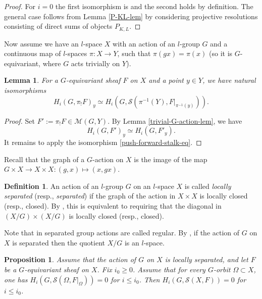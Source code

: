 \documentclass[12pt,reqno]{amsart}
\newtheorem{lemma}[theorem]{Lemma}
\newtheorem{prop}[theorem]{Proposition}
\theoremstyle{definition}
\newtheorem{definition}[theorem]{Definition}
\theoremstyle{remark}
\numberwithin{equation}{section}
\newcommand{\Om}{\Omega}
\renewcommand{\SS}{{\mathcal S}}
\newcommand{\MM}{{\mathcal M}}
\newcommand{\sub}{\subset}
\begin{document}
\begin{proof} For $i=0$ the first isomorphism is \cite[Prop.\ 2.36]{BZ} and the second holds by definition. 
The general case follows from Lemma \ref{P-KL-lem} by considering projective resolutions 
consisting of direct sums of objects $P_{K,L}$.
\end{proof}

Now assume we have an $l$-space $X$ with an action of an $l$-group $G$ and a continuous map of $l$-spaces
$\pi:X\to Y$, such that $\pi(gx)=\pi(x)$ (so it is $G$-equivariant, where $G$ acts trivially on $Y$).

\begin{lemma}\label{sh-G-hom-lem}
For a $G$-equivariant sheaf $F$ on $X$ and a point $y\in Y$, we have natural isomorphisms
$$H_i(G,\pi_!F)_y\simeq H_i(G,\SS(\pi^{-1}(Y),F|_{\pi^{-1}(y)})).$$
\end{lemma}

\begin{proof}
Set $F':=\pi_!F\in\MM(G,Y)$. By Lemma \ref{trivial-G-action-lem}, we have
$$H_i(G,F')_y\simeq H_i(G,F'_y).$$
It remains to apply the isomorphism \eqref{push-forward-stalk-eq}. 
\end{proof}

Recall that the graph of a $G$-action on $X$ is the image of the map $G\times X\to X\times X: (g,x)\mapsto (x,gx)$.

\begin{definition}\label{loc-sep-def}
An action of an $l$-group $G$ on an $l$-space $X$ is called {\it locally separated} (resp., {\it separated}) if the graph of the action in $X\times X$
is locally closed (resp., closed). By \cite[Lem.\ 6.2]{BZ}, this is equivalent to requiring that the diagonal in $(X/G)\times(X/G)$ is locally closed (resp., closed).
\end{definition}

Note that in \cite{BZ} separated group actions are called regular. By \cite[Lem.\ 6.4]{BZ}, if the action of $G$ on $X$ is separated then the quotient $X/G$ is an $l$-space.

\begin{prop}\label{hom-van-prop} 
Assume that the action of $G$ on $X$ is locally separated, and let $F$ be a $G$-equivariant sheaf on $X$.
Fix $i_0\ge 0$. Assume that for every $G$-orbit $\Om\sub X$, one has
$H_i(G,\SS(\Om,F|_{\Om}))=0$ for $i\le i_0$. Then $H_i(G,\SS(X,F))=0$ for $i\le i_0$.
\end{prop}
\end{document}
